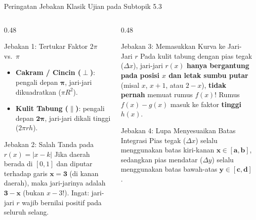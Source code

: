 \documentclass[aspectratio=43,10pt]{beamer}
\begin{document}
\begin{frame}{Peringatan Jebakan Klasik Ujian pada Subtopik 5.3}
    \begin{columns}[T]
        \begin{column}{0.48\textwidth}
            \begin{alertblock}{Jebakan 1: Tertukar Faktor $2\pi$ vs.\ $\pi$}
                \scriptsize
                \begin{itemize}\itemsep=1pt
                    \item \textbf{Cakram / Cincin ($\perp$)}: pengali depan $\mathbf{\pi}$, jari-jari dikuadratkan ($\pi R^2$).
                    \item \textbf{Kulit Tabung ($\parallel$)}: pengali depan $\mathbf{2\pi}$, jari-jari dikali tinggi ($2\pi r h$).
                \end{itemize}
            \end{alertblock}

            \begin{alertblock}{Jebakan 2: Salah Tanda pada $r(x) = |x - k|$}
                \scriptsize
                Jika daerah berada di $[0, 1]$ dan diputar terhadap garis $\mathbf{x = 3}$ (di kanan daerah), maka jari-jarinya adalah $\mathbf{3 - x}$ (bukan $x - 3$!). Ingat: jari-jari $r$ wajib bernilai positif pada seluruh selang.
            \end{alertblock}
        \end{column}

        \begin{column}{0.48\textwidth}
            \begin{alertblock}{Jebakan 3: Memasukkan Kurva ke Jari-Jari $r$}
                \scriptsize
                Pada kulit tabung dengan pias tegak ($\Delta x$), jari-jari $r(x)$ \textbf{hanya bergantung pada posisi $x$ dan letak sumbu putar} (misal $x$, $x + 1$, atau $2 - x$), \textbf{tidak pernah} memuat rumus $f(x)$! Rumus $f(x) - g(x)$ masuk ke faktor \textbf{tinggi $h(x)$}.
            \end{alertblock}

            \begin{exampleblock}{Jebakan 4: Lupa Menyesuaikan Batas Integrasi}
                \scriptsize
                Pias tegak ($\Delta x$) selalu menggunakan batas kiri-kanan $\mathbf{x \in [a, b]}$, sedangkan pias mendatar ($\Delta y$) selalu menggunakan batas bawah-atas $\mathbf{y \in [c, d]}$.
            \end{exampleblock}
        \end{column}
    \end{columns}
\end{frame}
\end{document}
